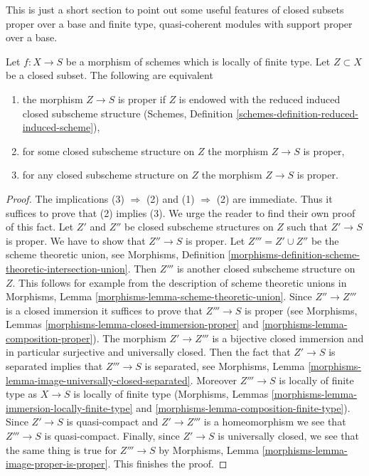 \noindent
This is just a short section to point out some useful features
of closed subsets proper over a base and finite type, quasi-coherent
modules with support proper over a base.

\begin{lemma}
\label{lemma-closed-proper-over-base}
Let $f : X \to S$ be a morphism of schemes which is locally of finite type.
Let $Z \subset X$ be a closed subset. The following are equivalent
\begin{enumerate}
\item the morphism $Z \to S$ is proper if $Z$ is endowed with the reduced
induced closed subscheme structure
(Schemes, Definition \ref{schemes-definition-reduced-induced-scheme}),
\item for some closed subscheme structure on $Z$ the morphism $Z \to S$
is proper,
\item for any closed subscheme structure on $Z$ the morphism
$Z \to S$ is proper.
\end{enumerate}
\end{lemma}

\begin{proof}
The implications (3) $\Rightarrow$ (2) and (1) $\Rightarrow$ (2)
are immediate. Thus it suffices to prove that (2) implies (3).
We urge the reader to find their own proof of this fact.
Let $Z'$ and $Z''$ be closed subscheme structures on $Z$
such that $Z' \to S$ is proper. We have to show that $Z'' \to S$ is proper.
Let $Z''' = Z' \cup Z''$ be the scheme theoretic union, see
Morphisms, Definition
\ref{morphisms-definition-scheme-theoretic-intersection-union}.
Then $Z'''$ is another closed subscheme structure on $Z$.
This follows for example from the description of scheme theoretic unions in
Morphisms, Lemma \ref{morphisms-lemma-scheme-theoretic-union}.
Since $Z'' \to Z'''$ is a closed immersion it suffices to prove
that $Z''' \to S$ is proper (see
Morphisms, Lemmas \ref{morphisms-lemma-closed-immersion-proper} and
\ref{morphisms-lemma-composition-proper}).
The morphism $Z' \to Z'''$ is a bijective closed immersion
and in particular surjective and universally closed.
Then the fact that $Z' \to S$ is separated implies that
$Z''' \to S$ is separated, see
Morphisms, Lemma \ref{morphisms-lemma-image-universally-closed-separated}.
Moreover $Z''' \to S$ is locally of finite type
as $X \to S$ is locally of finite type
(Morphisms, Lemmas \ref{morphisms-lemma-immersion-locally-finite-type} and
\ref{morphisms-lemma-composition-finite-type}).
Since $Z' \to S$ is quasi-compact and $Z' \to Z'''$ is a homeomorphism
we see that $Z''' \to S$ is quasi-compact.
Finally, since $Z' \to S$ is universally closed, we see that
the same thing is true for $Z''' \to S$ by
Morphisms, Lemma \ref{morphisms-lemma-image-proper-is-proper}.
This finishes the proof.
\end{proof}

